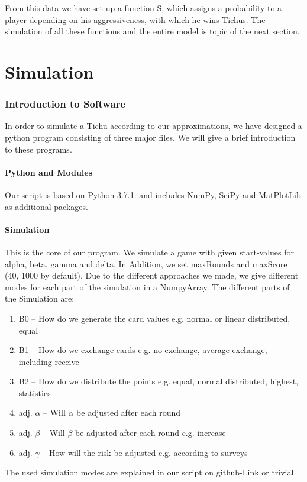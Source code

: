 From this data we have set up a function S, which assigns a probability to a player depending on his aggressiveness, with which he wins Tichus. The simulation of all these functions and the entire model is topic  of the next section.
\section{Simulation}
\subsubsection{Introduction to Software}
In order to simulate a Tichu according to our approximations, we have designed a python program consisting of three major files. We will give a brief introduction to these programs.

\paragraph{Python and Modules}
Our script is based on Python 3.7.1. and includes NumPy, SciPy and MatPlotLib as additional packages. 

\paragraph{Simulation}
This is the core of our program. We simulate a game with given start-values for alpha, beta, gamma and delta. In Addition, we set maxRounds and maxScore (40, 1000 by default). 
Due to the different approaches we made, we give different modes for each part of the simulation in a NumpyArray. The different parts of the Simulation are:
\begin{enumerate}
\item B0 – How do we generate the card values e.g. normal or linear distributed, equal
\item B1 – How do we exchange cards e.g. no exchange, average exchange, including receive
\item B2 – How do we distribute the points e.g. equal, normal distributed, highest, statistics
\item adj. $\alpha$ – Will $\alpha$ be adjusted after each round
\item adj. $\beta$ – Will $\beta$ be adjusted after each round e.g. increase
\item adj. $\gamma$ – How will the risk be adjusted e.g. according to surveys
\end{enumerate}
The used simulation modes are explained in our script on github-Link or trivial. 

